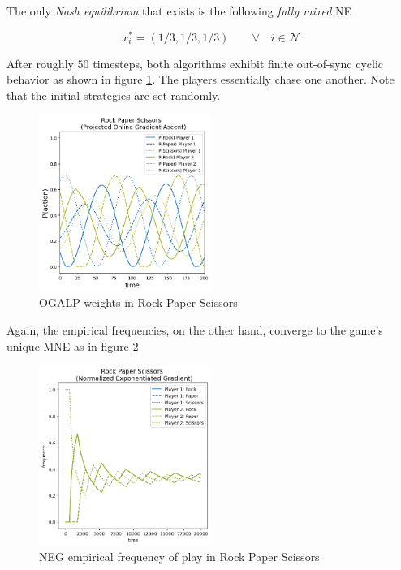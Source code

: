 The only \textit{Nash equilibrium} that exists is the following \textit{fully mixed} NE

\begin{equation*}
    x_{i}^{*} = (1/3,1/3,1/3) \qquad \forall \quad i \in \mathcal{N}
\end{equation*}

After roughly $50$ timesteps, both algorithms exhibit finite out-of-sync cyclic behavior as shown in figure \ref{fig:RPS2}. The players essentially chase one another. Note that the initial strategies are set randomly. 

\begin{figure}[H]
    \centering
    \includegraphics[width=0.5\textwidth]{logos/RPS2.png}
    \caption{OGALP weights in Rock Paper Scissors}
    \label{fig:RPS2}
\end{figure}


Again, the empirical frequencies, on the other hand, converge to the game's unique MNE as in figure \ref{fig:RPS3}

\begin{figure}[H]
    \centering
    \includegraphics[width=0.5\textwidth]{logos/RPS3.png}
    \caption{NEG empirical frequency of play in Rock Paper Scissors}
    \label{fig:RPS3}
\end{figure}


